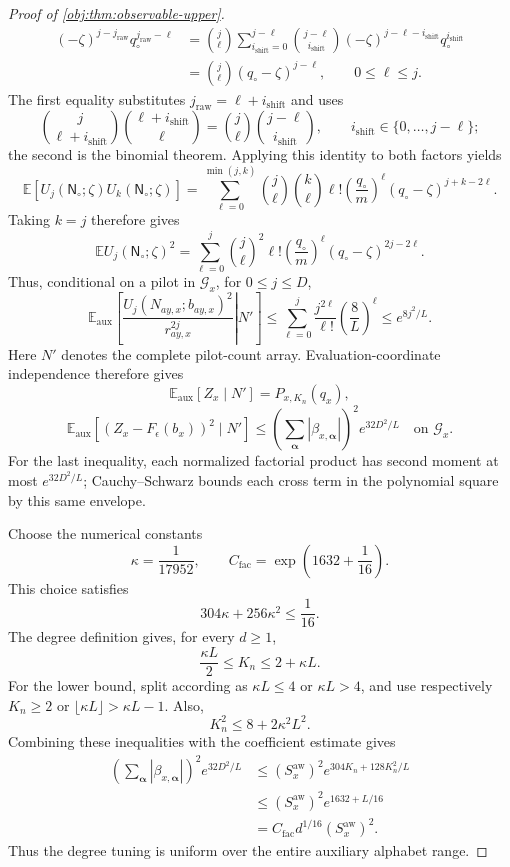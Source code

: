 \documentclass[11pt]{article}
\begin{document}
\begin{proof}[Proof of \cref{obj:thm:observable-upper}]
\[\begin{aligned}
(-\zeta)^{j-j_{\mathrm{raw}}}
q_\circ^{j_{\mathrm{raw}}-\ell}
&=
\binom j\ell
\sum_{i_{\mathrm{shift}}=0}^{j-\ell}
\binom{j-\ell}{i_{\mathrm{shift}}}
(-\zeta)^{j-\ell-i_{\mathrm{shift}}}
q_\circ^{i_{\mathrm{shift}}}\\
&=\binom j\ell(q_\circ-\zeta)^{j-\ell},
\qquad 0\le\ell\le j.
\end{aligned}
\]
The first equality substitutes \(j_{\mathrm{raw}}=\ell+i_{\mathrm{shift}}\) and uses
\[
\binom j{\ell+i_{\mathrm{shift}}}
\binom{\ell+i_{\mathrm{shift}}}\ell
=
\binom j\ell\binom{j-\ell}{i_{\mathrm{shift}}},
\qquad
 i_{\mathrm{shift}}\in\{0,\ldots,j-\ell\};
\]
the second is the binomial theorem. Applying this identity to both factors yields
\[
\mathbb E[U_j(\mathsf N_\circ;\zeta)U_k(\mathsf N_\circ;\zeta)]
=
\sum_{\ell=0}^{\min(j,k)}
\binom j\ell\binom k\ell\ell!
\left(\frac{q_\circ}{m}\right)^\ell
(q_\circ-\zeta)^{j+k-2\ell}.
\]
Taking \(k=j\) therefore gives
\[
\mathbb E U_j(\mathsf N_\circ;\zeta)^2
=
\sum_{\ell=0}^{j}
\binom j\ell^2\ell!
\left(\frac{q_\circ}{m}\right)^\ell
(q_\circ-\zeta)^{2j-2\ell}.
\]
Thus, conditional on a pilot in \(\mathcal G_x\), for \(0\le j\le D\),
\[
\mathbb E_{\mathrm{aux}}
\left[
\left.
\frac{U_j(N_{ay,x};b_{ay,x})^2}{r_{ay,x}^{2j}}
\right|N'
\right]
\le
\sum_{\ell=0}^{j}\frac{j^{2\ell}}{\ell!}
\left(\frac8L\right)^\ell
\le e^{8j^2/L}.
\]
Here \(N'\) denotes the complete pilot-count array. Evaluation-coordinate independence therefore gives
\[
\mathbb E_{\mathrm{aux}}[Z_x\mid N']
=P_{x,K_n}(q_x),
\]
\[
\mathbb E_{\mathrm{aux}}
[(Z_x-F_\epsilon(b_x))^2\mid N']
\le
\left(\sum_{\boldsymbol\alpha}|\beta_{x,\boldsymbol\alpha}|\right)^2
e^{32D^2/L}
\quad\text{on }\mathcal G_x.
\]
For the last inequality, each normalized factorial product has second moment at most \(e^{32D^2/L}\); Cauchy--Schwarz bounds each cross term in the polynomial square by this same envelope.

Choose the numerical constants
\[
\kappa=\frac1{17952},
\qquad
C_{\mathrm{fac}}=\exp\left(1632+\frac1{16}\right).
\]
This choice satisfies
\[
304\kappa+256\kappa^2\le\frac1{16}.
\]
The degree definition gives, for every \(d\ge1\),
\[
\frac{\kappa L}{2}\le K_n\le2+\kappa L.
\]
For the lower bound, split according as \(\kappa L\le4\) or \(\kappa L>4\), and use respectively \(K_n\ge2\) or
\(\lfloor\kappa L\rfloor>\kappa L-1\). Also,
\[
K_n^2\le8+2\kappa^2L^2.
\]
Combining these inequalities with the coefficient estimate gives
\[
\begin{aligned}
\left(\sum_{\boldsymbol\alpha}|\beta_{x,\boldsymbol\alpha}|\right)^2
e^{32D^2/L}
&\le
(S_x^{\mathrm{aw}})^2
e^{304K_n+128K_n^2/L}\\
&\le
(S_x^{\mathrm{aw}})^2e^{1632+L/16}\\
&=
C_{\mathrm{fac}}d^{1/16}(S_x^{\mathrm{aw}})^2.
\end{aligned}
\]
Thus the degree tuning is uniform over the entire auxiliary alphabet range.


\end{proof}
\end{document}
